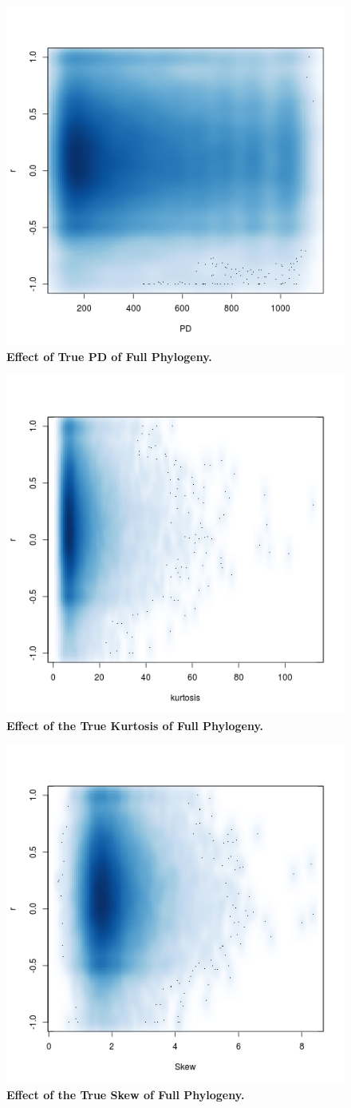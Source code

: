 \documentclass[12pt,english]{article}
\begin{document}
\begin{figure}[!ht]
  \center
  \includegraphics[width=.5\textwidth]{PD.png}
  \caption{\textbf{Effect of True PD of Full Phylogeny.}}
\end{figure}

\begin{figure}[!ht]
  \center
  \includegraphics[width=.5\textwidth]{originalKurtosis.png}
  \caption{\textbf{Effect of the True Kurtosis of Full Phylogeny.}}
\end{figure}

\begin{figure}[!ht]
  \center
  \includegraphics[width=.5\textwidth]{originalSkew.png}
  \caption{\textbf{Effect of the True Skew of Full Phylogeny.}}
\end{figure}
\end{document}
